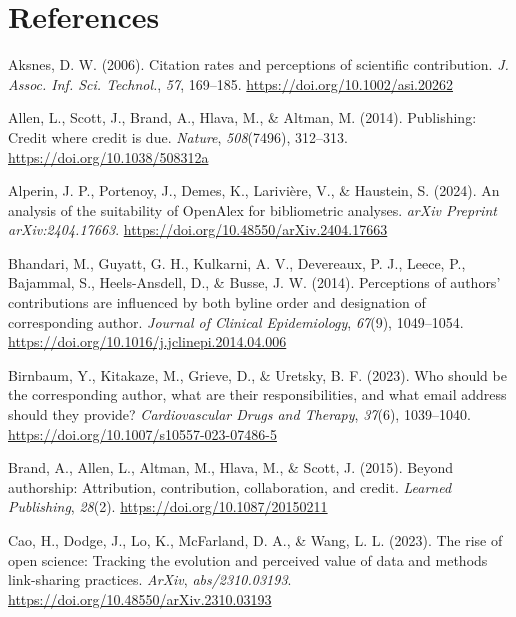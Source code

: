 \documentclass[
  number,
  3p,
  onecolumn]{elsarticle}
\newlength{\cslhangindent}
\newenvironment{CSLReferences}[2] %
 {\begin{list}{}{%
  \setlength{\itemindent}{0pt}
  \setlength{\leftmargin}{0pt}
  \setlength{\parsep}{0pt}
  \ifodd #1
   \setlength{\leftmargin}{\cslhangindent}
   \setlength{\itemindent}{-1\cslhangindent}
  \fi
  \setlength{\itemsep}{#2\baselineskip}}}
 {\end{list}}
\begin{document}
\section*{References}\label{references}

\label{refs}
\begin{CSLReferences}{1}{0}
Aksnes, D. W. (2006). Citation rates and perceptions of scientific
contribution. \emph{J. Assoc. Inf. Sci. Technol.}, \emph{57}, 169--185.
\url{https://doi.org/10.1002/asi.20262}

Allen, L., Scott, J., Brand, A., Hlava, M., \& Altman, M. (2014).
Publishing: Credit where credit is due. \emph{Nature}, \emph{508}(7496),
312--313. \url{https://doi.org/10.1038/508312a}

Alperin, J. P., Portenoy, J., Demes, K., Larivière, V., \& Haustein, S.
(2024). An analysis of the suitability of OpenAlex for bibliometric
analyses. \emph{arXiv Preprint arXiv:2404.17663}.
\url{https://doi.org/10.48550/arXiv.2404.17663}

Bhandari, M., Guyatt, G. H., Kulkarni, A. V., Devereaux, P. J., Leece,
P., Bajammal, S., Heels-Ansdell, D., \& Busse, J. W. (2014). Perceptions
of authors' contributions are influenced by both byline order and
designation of corresponding author. \emph{Journal of Clinical
Epidemiology}, \emph{67}(9), 1049--1054.
\url{https://doi.org/10.1016/j.jclinepi.2014.04.006}

Birnbaum, Y., Kitakaze, M., Grieve, D., \& Uretsky, B. F. (2023). Who
should be the corresponding author, what are their responsibilities, and
what email address should they provide? \emph{Cardiovascular Drugs and
Therapy}, \emph{37}(6), 1039--1040.
\url{https://doi.org/10.1007/s10557-023-07486-5}

Brand, A., Allen, L., Altman, M., Hlava, M., \& Scott, J. (2015). Beyond
authorship: Attribution, contribution, collaboration, and credit.
\emph{Learned Publishing}, \emph{28}(2).
\url{https://doi.org/10.1087/20150211}

Cao, H., Dodge, J., Lo, K., McFarland, D. A., \& Wang, L. L. (2023). The
rise of open science: Tracking the evolution and perceived value of data
and methods link-sharing practices. \emph{ArXiv}, \emph{abs/2310.03193}.
\url{https://doi.org/10.48550/arXiv.2310.03193}


\end{CSLReferences}
\end{document}
